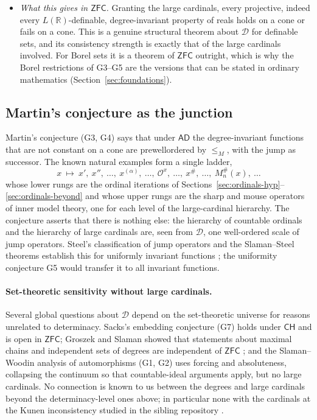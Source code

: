 \documentclass[11pt,a4paper]{article}
\newcommand{\D}{\mathcal D}
\theoremstyle{definition}\newtheorem{definition}[theorem]{Definition}
\theoremstyle{remark}\newtheorem{remark}[theorem]{Remark}
\begin{document}
\begin{itemize}
\item \emph{What this gives in $\mathsf{ZFC}$.} Granting the large cardinals, every projective, indeed every $L(\mathbb R)$-definable, degree-invariant property of reals holds on a cone or fails on a cone. This is a genuine structural theorem about $\D$ for definable sets, and its consistency strength is exactly that of the large cardinals involved. For Borel sets it is a theorem of $\mathsf{ZFC}$ outright, which is why the Borel restrictions of G3--G5 are the versions that can be stated in ordinary mathematics (Section~\ref{sec:foundations}).
\end{itemize}

\subsection{Martin's conjecture as the junction}
\label{sec:ordinals-martin}
Martin's conjecture (G3, G4) says that under $\mathsf{AD}$ the degree-invariant functions that are not constant on a cone are prewellordered by $\leq_M$, with the jump as successor. The known natural examples form a single ladder,
\[
 x\ \mapsto\ x',\ x'',\ \ldots,\ x^{(\alpha)},\ \ldots,\ \mathcal O^x,\ \ldots,\ x^\#,\ \ldots,\ M_n^\#(x),\ \ldots
\]
whose lower rungs are the ordinal iterations of Sections~\ref{sec:ordinals-hyp}--\ref{sec:ordinals-beyond} and whose upper rungs are the sharp and mouse operators of inner model theory, one for each level of the large-cardinal hierarchy. The conjecture asserts that there is nothing else: the hierarchy of countable ordinals and the hierarchy of large cardinals are, seen from $\D$, one well-ordered scale of jump operators. Steel's classification of jump operators and the Slaman--Steel theorems establish this for uniformly invariant functions \cite{SteelJump,MSS}; the uniformity conjecture G5 would transfer it to all invariant functions.

\paragraph{Set-theoretic sensitivity without large cardinals.} Several global questions about $\D$ depend on the set-theoretic universe for reasons unrelated to determinacy. Sacks's embedding conjecture (G7) holds under $\mathsf{CH}$ and is open in $\mathsf{ZFC}$; Groszek and Slaman showed that statements about maximal chains and independent sets of degrees are independent of $\mathsf{ZFC}$ \cite{GroszekSlaman}; and the Slaman--Woodin analysis of automorphisms (G1, G2) uses forcing and absoluteness, collapsing the continuum so that countable-ideal arguments apply, but no large cardinals. No connection is known to us between the degrees and large cardinals beyond the determinacy-level ones above; in particular none with the cardinals at the Kunen inconsistency studied in the sibling repository .
\end{document}
